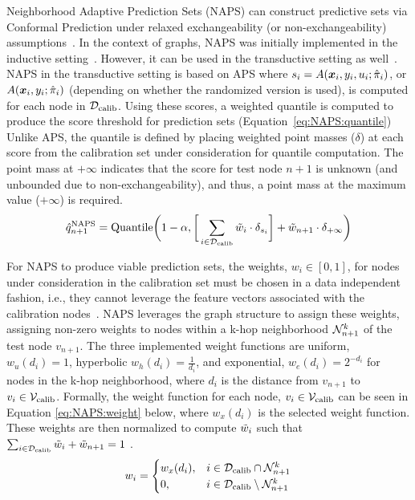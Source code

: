 Neighborhood Adaptive Prediction Sets (NAPS) can construct predictive sets via Conformal Prediction under relaxed exchangeability (or non-exchangeability) assumptions~\cite{barber2023conformal}.
In the context of graphs, NAPS was initially implemented in the inductive setting~\cite{clarkson2023distribution}.
However, it can be used in the transductive setting as well~\cite{zargarbashi23conformal}. 
NAPS in the transductive setting is based on APS where $s_i = A({\bm{x}}_i, y_i, u_i;\hat{\pi}_i)$, or $A({\bm{x}}_i, y_i;\hat{\pi}_i)$ (depending on whether the randomized version is used), is computed for each node in ${\mathcal{D}}_{\text{calib}}$. 
Using these scores, a weighted quantile is computed to produce the score threshold for prediction sets (Equation~\ref{eq:NAPS:quantile})
Unlike APS, the quantile is defined by placing weighted point masses ($\delta$) at each score from the calibration set under consideration for quantile computation.
The point mass at $+\infty$ indicates that the score for test node $n+1$ is unknown (and unbounded due to non-exchangeability), and thus, a point mass at the maximum value ($+\infty$) is required.%
\begin{align}
    \hat{q}^{\text{NAPS}}_{n+1} = \text{Quantile}\bigg(1-\alpha, \bigg[\sum_{i\in{\mathcal{D}}_{\text{calib}}}\Tilde{w}_{i}\cdot \delta_{s_{i}}\bigg] + \Tilde{w}_{n+1}\cdot \delta_{+\infty}\bigg)
    \label{eq:NAPS:quantile}
\end{align}

For NAPS to produce viable prediction sets, the weights, $w_i\in [0,1]$, for nodes under consideration in the calibration set must be chosen in a data independent fashion, i.e., they cannot leverage the feature vectors associated with the calibration nodes~\citep{barber2023conformal}.
NAPS leverages the graph structure to assign these weights, assigning non-zero weights to nodes within a k-hop neighborhood ${\mathcal{N}}_{n+1}^k$ of the test node $v_{n+1}$.
The three implemented weight functions are uniform, $w_u(d_i) = 1$, hyperbolic $w_h(d_i) = \frac{1}{d_i}$, and exponential, $w_e(d_i) = 2^{-d_i}$ for nodes in the k-hop neighborhood, where $d_i$ is the distance from $v_{n+1}$ to $v_i \in {\mathcal{V}}_{\text{calib}}$.
Formally, the weight function for each node, $v_i \in {\mathcal{V}}_{\text{calib}}$ can be seen in Equation \ref{eq:NAPS:weight} below, where $w_x(d_i)$ is the selected weight function.
These weights are then normalized to compute $\Tilde{w}_i$ such that $\sum_{i\in{\mathcal{D}}_{\text{calib}}} \Tilde{w}_i + \Tilde{w}_{n+1} = 1$ \cite{barber2023conformal}.
\begin{align}
    w_i = \begin{cases}
w_x(d_i), & i\in {\mathcal{D}}_{\text{calib}}\cap\mathcal{N}_{n+1}^k\\
0,& i\in {\mathcal{D}}_{\text{calib}}\setminus\mathcal{N}_{n+1}^k
\end{cases}
    \label{eq:NAPS:weight}
\end{align}

